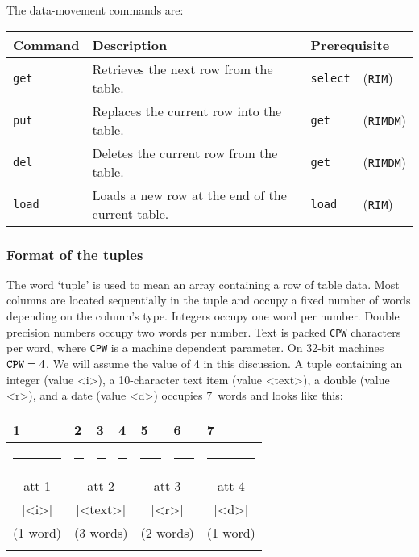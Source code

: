\documentclass[11pt,a4paper]{report}
\begin{document}
The data-movement commands are:
 
\medskip
\begin{tabular}{lp{12pc}ll}
Command&
Description&
\multicolumn{2}{l}{Prerequisite}\\
\hline
\verb!get! & Retrieves the next row from the table.& \verb!select!&(\verb!RIM!)\\
\verb!put!& Replaces the current row into the table.& \verb!get!&(\verb!RIMDM!)\\
\verb!del!& Deletes the current row from the table.& \verb!get!&(\verb!RIMDM!)\\
\verb!load!& Loads a new row at the end of the current table.& \verb!load!&(\verb!RIM!)
\end{tabular}
 
\medskip
 
\subsubsection{Format of the tuples}
%
The word `tuple' is used to mean an array containing a row of table data.
Most columns are located sequentially in the tuple and
occupy a fixed number of words depending on the column's type.
Integers occupy one word per number.  Double precision numbers
occupy two words per number.  Text is packed {\tt CPW}
characters per word, where {\tt CPW} is a machine dependent
parameter.  On 32-bit machines $\mbox{\tt CPW}=4$. We will
assume the value of 4 in this discussion.
A tuple containing an integer (value <i>), a 10-character text item
(value <text>),
a double (value <r>),
and a date (value <d>) occupies 7~words and looks like this:
 
\smallskip
{\centering\small{}
 \def\strut{\rule{0pt}{2pt}} \def\Strut{\rule{0pt}{12pt}}
 \def\fl{\multicolumn{1}{|l|}}
\begin{tabular}{|c|c|c|c|c|c|c|}
 \fl{1}&\fl{2}&\fl{3}&\fl{4}&\fl{5}&\fl{6}&\fl{7}\\
 \hline
   \rule{38pt}{0pt}&
   \rule{38pt}{0pt}&
   \rule{38pt}{0pt}&
   \rule{38pt}{0pt}&
   \rule{38pt}{0pt}&
   \rule{38pt}{0pt}&
   \rule{38pt}{0pt}\\
 \Strut att 1&
 \multicolumn{3}{|c|}{att 2}&
 \multicolumn{2}{|c|}{att 3}&
 att 4\\
 \Strut [<i>]&
 \multicolumn{3}{|c|}{[<text>]}&
 \multicolumn{2}{|c|}{[<r>]}&
 [<d>]\\
 \Strut (1 word)&
 \multicolumn{3}{|c|}{(3 words)}&
 \multicolumn{2}{|c|}{(2 words)}&
 (1 word)\\
 &&&&&&\\
 \hline
\end{tabular}
 \par}
 
\end{document}
